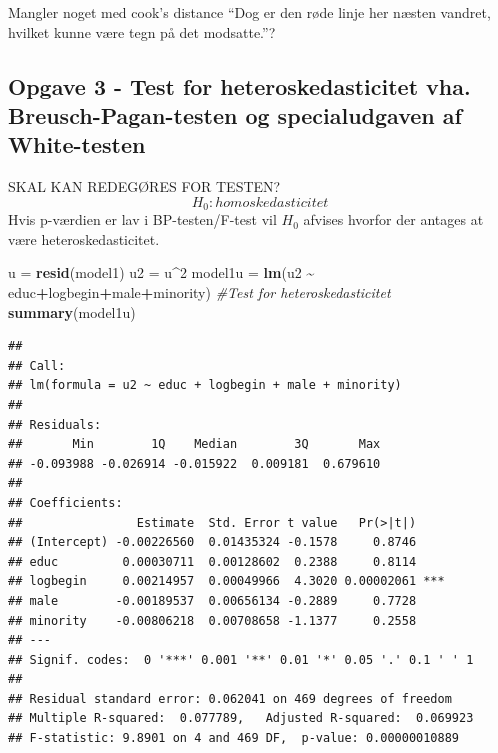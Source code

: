 \documentclass[
]{article}
\newenvironment{Shaded}{\begin{snugshade}}{\end{snugshade}}
\newcommand{\CommentTok}[1]{\textcolor[rgb]{0.56,0.35,0.01}{\textit{#1}}}
\newcommand{\DecValTok}[1]{\textcolor[rgb]{0.00,0.00,0.81}{#1}}
\newcommand{\FunctionTok}[1]{\textcolor[rgb]{0.13,0.29,0.53}{\textbf{#1}}}
\newcommand{\NormalTok}[1]{#1}
\newcommand{\OtherTok}[1]{\textcolor[rgb]{0.56,0.35,0.01}{#1}}
\newcommand{\SpecialCharTok}[1]{\textcolor[rgb]{0.81,0.36,0.00}{\textbf{#1}}}
\begin{document}
Mangler noget med cook's distance ``Dog er den røde linje her næsten
vandret, hvilket kunne være tegn på det modsatte.''?

\hypertarget{opgave-3---test-for-heteroskedasticitet-vha.-breusch-pagan-testen-og-specialudgaven-af-white-testen}{%
\subsection{Opgave 3 - Test for heteroskedasticitet vha.
Breusch-Pagan-testen og specialudgaven af
White-testen}\label{opgave-3---test-for-heteroskedasticitet-vha.-breusch-pagan-testen-og-specialudgaven-af-white-testen}}

SKAL KAN REDEGØRES FOR TESTEN? \[H_0: homoskedasticitet\] Hvis p-værdien
er lav i BP-testen/F-test vil \(H_0\) afvises hvorfor der antages at
være heteroskedasticitet.

\begin{Shaded}
\begin{Highlighting}[]
\NormalTok{u }\OtherTok{=} \FunctionTok{resid}\NormalTok{(model1)}
\NormalTok{u2 }\OtherTok{=}\NormalTok{ u}\SpecialCharTok{\^{}}\DecValTok{2}
\NormalTok{model1u }\OtherTok{=} \FunctionTok{lm}\NormalTok{(u2 }\SpecialCharTok{\textasciitilde{}}\NormalTok{ educ}\SpecialCharTok{+}\NormalTok{logbegin}\SpecialCharTok{+}\NormalTok{male}\SpecialCharTok{+}\NormalTok{minority) }\CommentTok{\#Test for heteroskedasticitet}
\FunctionTok{summary}\NormalTok{(model1u)}
\end{Highlighting}
\end{Shaded}

\begin{verbatim}
## 
## Call:
## lm(formula = u2 ~ educ + logbegin + male + minority)
## 
## Residuals:
##       Min        1Q    Median        3Q       Max 
## -0.093988 -0.026914 -0.015922  0.009181  0.679610 
## 
## Coefficients:
##                Estimate  Std. Error t value   Pr(>|t|)    
## (Intercept) -0.00226560  0.01435324 -0.1578     0.8746    
## educ         0.00030711  0.00128602  0.2388     0.8114    
## logbegin     0.00214957  0.00049966  4.3020 0.00002061 ***
## male        -0.00189537  0.00656134 -0.2889     0.7728    
## minority    -0.00806218  0.00708658 -1.1377     0.2558    
## ---
## Signif. codes:  0 '***' 0.001 '**' 0.01 '*' 0.05 '.' 0.1 ' ' 1
## 
## Residual standard error: 0.062041 on 469 degrees of freedom
## Multiple R-squared:  0.077789,   Adjusted R-squared:  0.069923 
## F-statistic: 9.8901 on 4 and 469 DF,  p-value: 0.00000010889
\end{verbatim}
\end{document}
